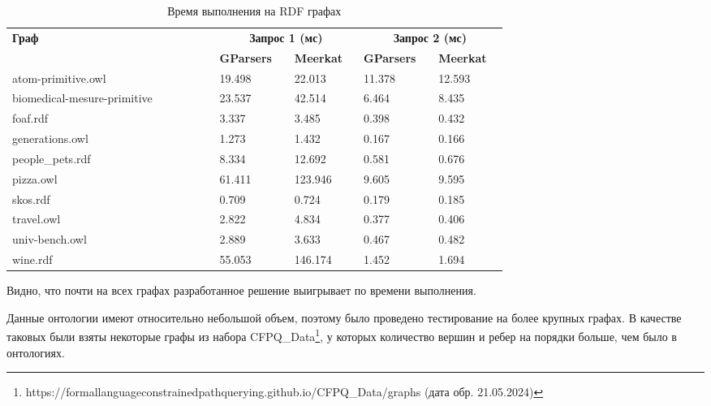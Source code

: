 \begin{table}[h]
    \caption{Время выполнения на RDF графах}
    \begin{tabular}{|b{0.36\linewidth}|b{0.13\linewidth}|b{0.12\linewidth}|b{0.13\linewidth}|b{0.12\linewidth}|}
        \hline
        \textbf{Граф} & \multicolumn{2}{|c|}{\textbf{Запрос 1 (мс)}} & \multicolumn{2}{|c|}{\textbf{Запрос 2 (мс)}} \\
        \cline{2-5}
         & \textbf{GParsers} & \textbf{Meerkat} & \textbf{GParsers} & \textbf{Meerkat} \\ 
        \hline
        atom-primitive.owl  & 19.498 & 22.013 & 11.378 & 12.593 \\
        biomedical-mesure-primitive  & 23.537 & 42.514 & 6.464 & 8.435 \\
        foaf.rdf  & 3.337 & 3.485 & 0.398 & 0.432 \\
        generations.owl  & 1.273 & 1.432 & 0.167 & 0.166 \\
        people\_pets.rdf  & 8.334 & 12.692 & 0.581 & 0.676 \\
        pizza.owl  & 61.411 & 123.946 & 9.605 & 9.595 \\
        skos.rdf  & 0.709 & 0.724 & 0.179 & 0.185 \\
        travel.owl  & 2.822 & 4.834 & 0.377 & 0.406 \\
        univ-bench.owl  & 2.889 & 3.633 & 0.467 & 0.482 \\
        wine.rdf  & 55.053 & 146.174 & 1.452 & 1.694 \\
        \hline
    \end{tabular}
    \label{tab:rdfTimes}
\end{table}

Видно, что почти на всех графах разработанное решение выигрывает по времени выполнения. 

Данные онтологии имеют относительно небольшой объем, поэтому было проведено тестирование на более крупных графах. В качестве таковых были взяты некоторые графы из набора CFPQ\_Data\footnote{https://formallanguageconstrainedpathquerying.github.io/CFPQ\_Data/graphs (дата обр. 21.05.2024)}, у которых количество вершин и ребер на порядки больше, чем было в онтологиях.

